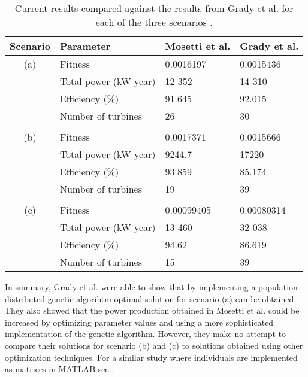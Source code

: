 \begin{table}[h!]
\begin{center}
\caption{Current results compared against the results from Grady et al. for each of the three scenarios \citep{Grady}.}
\label{Results Grady et al.}
\begin{tabular}{c|l|l|l}
Scenario & Parameter                    & Mosetti et al.  & Grady et al. \\ 
\hline 
(a)          & Fitness                        & 0.0016197     & 0.0015436 \\ 
              & Total power (kW year) & 12 352           & 14 310 \\ 
              & Efficiency (\%)            & 91.645            & 92.015 \\ 
              & Number of turbines     & 26                    & 30  \\ 
&&&\\
(b)         & Fitness                        & 0.0017371      & 0.0015666 \\ 
              & Total power (kW year) & 9244.7           & 17220 \\ 
              & Efficiency (\%)            & 93.859           & 85.174 \\ 
              & Number of turbines     & 19                   & 39 \\ 
&&&\\
(c)         & Fitness                        & 0.00099405   & 0.00080314 \\ 
              & Total power (kW year) & 13 460          & 32 038 \\ 
              & Efficiency (\%)            & 94.62            & 86.619 \\ 
              & Number of turbines     & 15                  & 39 \\  
\end{tabular} 
\end{center}
\end{table}


\noindent In summary, Grady et al. were able to show that by implementing a population distributed genetic algorihtm optimal solution for scenario (a) can be obtained. They also showed that the power production obtained in Mosetti et al. could be increased by optimizing parameter values and using a more sophisticated implementation of the genetic algorithm. However, they make no attempt to compare their solutions for scenario (b) and (c) to solutions obtained using other optimization techniques. For a similar study where individuals are implemented as matrices in MATLAB see \citep{Emami}.\\


